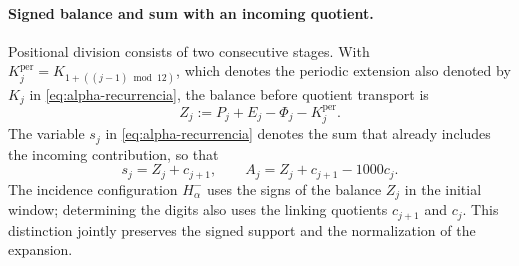 \paragraph{Signed balance and sum with an incoming quotient.}
\label{ampl-alfa-z-s-aclaracion}
Positional division consists of two consecutive stages. With
\(K_j^{\mathrm{per}}=K_{1+((j-1)\bmod12)}\), which denotes the
periodic extension also denoted by \(K_j\) in
\eqref{eq:alpha-recurrencia}, the balance before quotient
transport is
\[
 Z_j:=P_j+E_j-\Phi_j-K_j^{\mathrm{per}}.
\]
The variable $s_j$ in \eqref{eq:alpha-recurrencia} denotes the sum that already
includes the incoming contribution, so that
\[
 s_j=Z_j+c_{j+1},\qquad
 A_j=Z_j+c_{j+1}-1000c_j.
\]
The incidence configuration
$H^-_\alpha$ uses the signs of the balance $Z_j$ in the initial window;
determining the digits also uses the linking quotients
$c_{j+1}$ and $c_j$. This distinction jointly preserves the signed
support and the normalization of the expansion.
